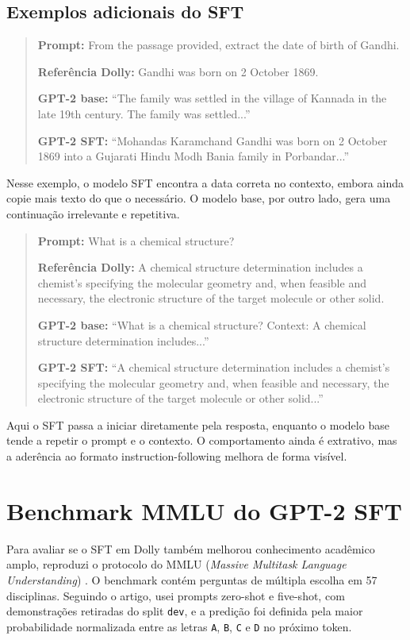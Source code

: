 \documentclass[a4paper,12pt]{article}
\begin{document}
\subsection*{Exemplos adicionais do SFT}

\begin{quote}
\small
\textbf{Prompt:} From the passage provided, extract the date of birth of Gandhi.

\textbf{Referência Dolly:} Gandhi was born on 2 October 1869.

\textbf{GPT-2 base:} ``The family was settled in the village of Kannada in the late 19th century. The family was settled...''

\textbf{GPT-2 SFT:} ``Mohandas Karamchand Gandhi was born on 2 October 1869 into a Gujarati Hindu Modh Bania family in Porbandar...''
\end{quote}

Nesse exemplo, o modelo SFT encontra a data correta no contexto, embora ainda copie mais texto do que o necessário. O modelo base, por outro lado, gera uma continuação irrelevante e repetitiva.

\begin{quote}
\small
\textbf{Prompt:} What is a chemical structure?

\textbf{Referência Dolly:} A chemical structure determination includes a chemist's specifying the molecular geometry and, when feasible and necessary, the electronic structure of the target molecule or other solid.

\textbf{GPT-2 base:} ``What is a chemical structure? Context: A chemical structure determination includes...''

\textbf{GPT-2 SFT:} ``A chemical structure determination includes a chemist's specifying the molecular geometry and, when feasible and necessary, the electronic structure of the target molecule or other solid...''
\end{quote}

Aqui o SFT passa a iniciar diretamente pela resposta, enquanto o modelo base tende a repetir o prompt e o contexto. O comportamento ainda é extrativo, mas a aderência ao formato instruction-following melhora de forma visível.

\section{Benchmark MMLU do GPT-2 SFT}

Para avaliar se o SFT em Dolly também melhorou conhecimento acadêmico amplo, reproduzi o protocolo do MMLU (\textit{Massive Multitask Language Understanding}) \cite{hendrycks2021measuring}. O benchmark contém perguntas de múltipla escolha em 57 disciplinas. Seguindo o artigo, usei prompts zero-shot e five-shot, com demonstrações retiradas do split \texttt{dev}, e a predição foi definida pela maior probabilidade normalizada entre as letras \texttt{A}, \texttt{B}, \texttt{C} e \texttt{D} no próximo token.
\end{document}
